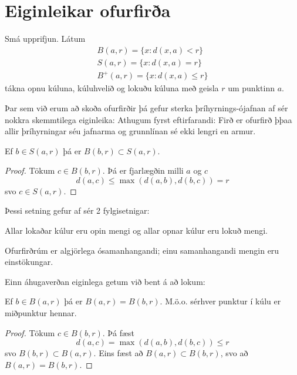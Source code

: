 \section*{Eiginleikar ofurfirða}
\begin{skilgr}
Smá upprifjun. Látum
\begin{align*}
B(a,r) = \{x:d(x,a)<r\} \\
S(a,r) = \{x:d(x,a) = r\} \\
B^+(a,r) = \{x:d(x,a) \leq r\}
\end{align*}
tákna opnu kúluna, kúluhvelið og lokuðu kúluna með geisla $r$ um punktinn $a$.
\end{skilgr}
Þar sem við erum að skoða ofurfirðir þá gefur sterka þríhyrnings-ójafnan af sér nokkra skemmtilega eiginleika:
Athugum fyrst eftirfarandi:
Firð er ofurfirð þþaa allir þríhyrningar séu jafnarma og grunnlínan sé ekki lengri en armur.
\begin{setn}
Ef $b \in S(a,r)$ þá er $B(b,r) \subset S(a,r)$.
\end{setn}
\begin{proof}
Tökum $c \in B(b,r)$. Þá er fjarlægðin milli $a$ og $c$
\begin{equation*}
d(a,c) \leq \max(d(a,b),d(b,c)) = r 
\end{equation*}
svo $c \in S(a,r)$.
\end{proof}
Þessi setning gefur af sér 2 fylgisetnigar:
\begin{fylgisetn}
Allar lokaðar kúlur eru opin mengi og allar opnar kúlur eru lokuð mengi.
\end{fylgisetn}
\begin{fylgisetn} 
Ofurfirðrúm er algjörlega ósamanhangandi; einu samanhangandi mengin eru einstökungar.
\end{fylgisetn}
Einn áhugaverðan eiginlega getum við bent á að lokum:
\begin{setn}
Ef $b\in B(a,r)$ þá er $B(a,r) = B(b,r)$. M.ö.o. sérhver punktur í kúlu er miðpunktur hennar.
\end{setn}
\begin{proof}
Tökum $c\in B(b,r)$. Þá fæst
\begin{equation*}
d(a,c) = \max (d(a,b),d(b,c)) \leq r
\end{equation*}
svo $B(b,r) \subset B(a,r)$. Eins fæst að $B(a,r) \subset B(b,r)$, svo að $B(a,r) = B(b,r)$.
\end{proof}


